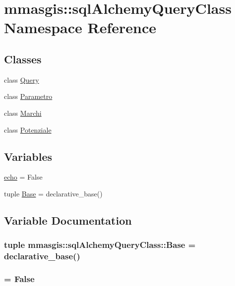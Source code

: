 \hypertarget{namespacemmasgis_1_1sqlAlchemyQueryClass}{
\section{mmasgis::sqlAlchemyQueryClass Namespace Reference}
\label{namespacemmasgis_1_1sqlAlchemyQueryClass}
}
\subsection*{Classes}
\begin{DoxyCompactItemize}
\item 
class \hyperlink{classmmasgis_1_1sqlAlchemyQueryClass_1_1Query}{Query}
\item 
class \hyperlink{classmmasgis_1_1sqlAlchemyQueryClass_1_1Parametro}{Parametro}
\item 
class \hyperlink{classmmasgis_1_1sqlAlchemyQueryClass_1_1Marchi}{Marchi}
\item 
class \hyperlink{classmmasgis_1_1sqlAlchemyQueryClass_1_1Potenziale}{Potenziale}
\end{DoxyCompactItemize}
\subsection*{Variables}
\begin{DoxyCompactItemize}
\item 
\hyperlink{namespacemmasgis_1_1sqlAlchemyQueryClass_adfaccfe9d8de589a368ac17c0f4ee8c1}{echo} = False
\item 
tuple \hyperlink{namespacemmasgis_1_1sqlAlchemyQueryClass_a62678982ecace43c7d6aefbed15de81a}{Base} = declarative\_\-base()
\end{DoxyCompactItemize}


\subsection{Variable Documentation}
\hypertarget{namespacemmasgis_1_1sqlAlchemyQueryClass_a62678982ecace43c7d6aefbed15de81a}{
\subsubsection[{Base}]{\setlength{\rightskip}{0pt plus 5cm}tuple {\bf mmasgis::sqlAlchemyQueryClass::Base} = declarative\_\-base()}}
\label{namespacemmasgis_1_1sqlAlchemyQueryClass_a62678982ecace43c7d6aefbed15de81a}
\hypertarget{namespacemmasgis_1_1sqlAlchemyQueryClass_adfaccfe9d8de589a368ac17c0f4ee8c1}{
\subsubsection[{echo}]{ = False}}
\label{namespacemmasgis_1_1sqlAlchemyQueryClass_adfaccfe9d8de589a368ac17c0f4ee8c1}
